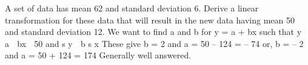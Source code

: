 \documentclass[a4paper,12pt]{article}
\begin{document}
A set of data has mean 62 and standard deviation 6.
Derive a linear transformation for these data that will result in the new data having
mean 50 and standard deviation 12.
We want to find a and b for y = a + bx such that
y  a  bx  50 and s y  b s x
These give b = 2 and a = 50 – 124 = – 74
or, b = – 2 and a = 50 + 124 = 174
Generally well answered.
\end{document}
